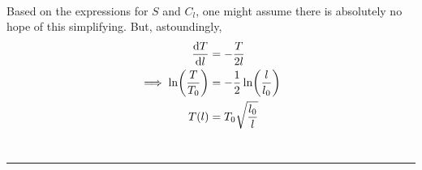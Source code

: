 \documentclass[]{book}
\begin{document}
\begin{enumerate}[1)]
\begin{equation}
\begin{split}
\end{split}
\end{equation}
Based on the expressions for $S$ and $C_l$, one might assume there is absolutely no hope of this simplifying. But, astoundingly, 
\begin{equation}
\begin{split}
\dv{T}{l} & =   - \frac{T}{2l}  \\
\implies \ln( \frac{T}{T_0} ) & = -\frac{1}{2} \ln( \frac{l}{l_0}) \\
T(l) & = T_0 \sqrt{\frac{l_0}{l}}
 \end{split}
\end{equation} \\
\end{enumerate} 
\noindent\rule{15cm}{0.4pt} \\
\end{document}
